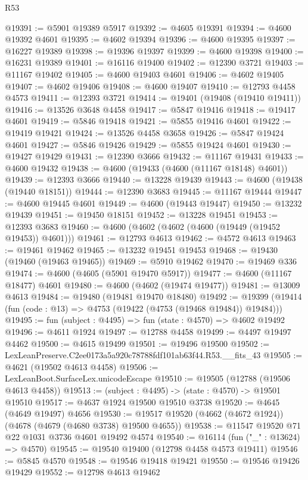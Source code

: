 \begin{lexlean}{R53}
\begin{coremodule}
@19391 := @5901 @19389 @5917
@19392 := @4605 @19391
@19394 := @4600 @19392 @4601
@19395 := @4602 @19394
@19396 := @4600 @19395
@19397 := @16227 @19389
@19398 := @19396 @19397
@19399 := @4600 @19398
@19400 := @16231 @19389
@19401 := @16116 @19400
@19402 := @12390 @3721
@19403 := @11167 @19402
@19405 := @4600 @19403 @4601
@19406 := @4602 @19405
@19407 := @4602 @19406
@19408 := @4600 @19407
@19410 := @12793 @4458 @4573
@19411 := @12393 @3721
@19414 := @19401 (@19408 (@19410 @19411))
@19416 := @13526 @3648 @4458
@19417 := @5847 @19416
@19418 := @19417 @4601
@19419 := @5846 @19418
@19421 := @5855 @19416 @4601
@19422 := @19419 @19421
@19424 := @13526 @4458 @3658
@19426 := @5847 @19424 @4601
@19427 := @5846 @19426
@19429 := @5855 @19424 @4601
@19430 := @19427 @19429
@19431 := @12390 @3666
@19432 := @11167 @19431
@19433 := @4600 @19432
@19438 := @4600 (@19433 (@4600 (@11167 @18148) @4601))
@19439 := @12393 @3666
@19440 := @13228 @19439
@19443 := @4600 (@19438 (@19440 @18151))
@19444 := @12390 @3683
@19445 := @11167 @19444
@19447 := @4600 @19445 @4601
@19449 := @4600 (@19443 @19447)
@19450 := @13232 @19439
@19451 := @19450 @18151
@19452 := @13228 @19451
@19453 := @12393 @3683
@19460 := @4600 (@4602 (@4602 (@4600 (@19449 (@19452 @19453)) @4601)))
@19461 := @12793 @4613
@19462 := @4572 @4613
@19463 := @19461 @19462
@19465 := @13232 @19451 @19453
@19468 := @19430 (@19460 (@19463 @19465))
@19469 := @5910 @19462
@19470 := @19469 @336
@19474 := @4600 (@4605 (@5901 @19470 @5917))
@19477 := @4600 (@11167 @18477) @4601
@19480 := @4600 (@4602 (@19474 @19477))
@19481 := @13009 @4613
@19484 := @19480 (@19481 @19470 @18480)
@19492 := @19399 (@19414 (fun (code : @13) => @4753 (@19422 (@4753 (@19468 @19484)) @19484)))
@19495 := fun (subject : @4495) => fun (state : @4570) => @4602 @19492
@19496 := @4611 @1924
@19497 := @12788 @4458
@19499 := @4497 @19497 @4462
@19500 := @4615 @19499
@19501 := @19496 @19500
@19502 := LexLeanPreserve.C2ee0173a5a920c78788fdf101ab63f44.R53.__fits_43
@19505 := @4621 (@19502 @4613 @4458)
@19506 := LexLeanBoot.SurfaceLex.unicodeEscape
@19510 := @19505 (@12788 (@19506 @4613 @4458))
@19513 := (subject : @4495) -> (state : @4570) -> @19501 @19510
@19517 := @4637 @1924 @19500 @19510 @3738
@19520 := @4645 (@4649 @19497) @4656
@19530 := @19517 @19520 (@4662 (@4672 @1924)) (@4678 (@4679 (@4680 @3738) @19500 @4655))
@19538 := @11547 @19520 @71 @22 @1031 @3736 @4601 @19492 @4574
@19540 := @16114 (fun ("_" : @13624) => @4570)
@19545 := @19540 @19400 (@12798 @4458 @4573 @19411)
@19546 := @5845 @4570
@19548 := @19546 @19418 @19421
@19550 := @19546 @19426 @19429
@19552 := @12798 @4613 @19462

\end{coremodule}
\end{lexlean}
